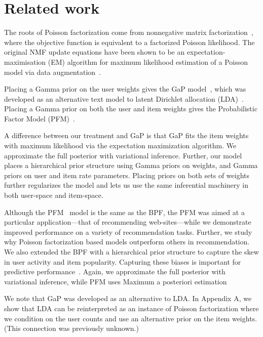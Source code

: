 \section{Related work}
The roots of Poisson factorization come from nonnegative matrix
factorization~\cite{Lee:1999}, where the objective function is
equivalent to a factorized Poisson likelihood.  The original NMF
update equations have been shown to be an expectation-maximisation
(EM) algorithm for maximum likelihood estimation of a Poisson model
via data augmentation~\cite{Cemgil:2009}.

Placing a Gamma prior on the user weights gives the GaP
model~\cite{Canny:2004}, which was developed as an alternative text
model to latent Dirichlet allocation (LDA)~\cite{Blei:2003b}. Placing
a Gamma prior on both the user and item weights gives the
Probabilistic Factor Model (PFM)~\cite{Ma:2011}.

A difference between our treatment and GaP is that GaP fits the item
weights with maximum likelihood via the expectation maximization
algorithm. We approximate the full posterior with variational
inference. Further, our model places a hierarchical prior structure
using Gamma priors on weights, and Gamma priors on user and item rate
parameters.  Placing priors on both sets of weights further
regularizes the model and lets us use the same inferential machinery
in both user-space and item-space. 

Although the PFM~\cite{Ma:2011} model is the same as the BPF, the PFM
was aimed at a particular application---that of recommending
web-sites---while we demonstrate improved performance on a variety of
recommendation tasks. Further, we study why Poisson factorization
based models outperform others in recommendation. We also extended the
BPF with a hierarchical prior structure to capture the skew in user
activity and item popularity. Capturing these biases is important for
predictive performance~\cite{Koren:2009}. Again, we approximate the
full posterior with variational inference, while PFM uses Maximum a
posteriori estimation


We note that GaP was developed as an alternative to LDA. In Appendix
A, we show that LDA can be reinterpreted as an instance of Poisson
factorization where we condition on the user counts and use an
alternative prior on the item weights.  (This connection was
previously unknown.)

